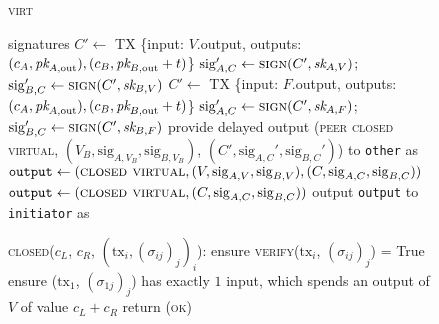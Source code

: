 \begin{figure}[H]
\begin{processbox}{\textsc{virt}}
\begin{algorithmic}[1]
{              signatures}
              \State $C' \gets$ TX \{input: $V$.output, outputs: $(c_A, \textit{pk}_{A,
              \mathrm{out}}), (c_B, \textit{pk}_{B, \mathrm{out}} + t)$\}
              \State $\mathrm{sig}_{A, C}' \gets \textsc{sign}(C', \textit{sk}_{A, V})$;
              $\mathrm{sig}_{B, C}' \gets \textsc{sign}(C', \textit{sk}_{B, V})$
            \Else \: 
              \State $C' \gets$ TX \{input: $F$.output, outputs: $(c_A, \textit{pk}_{A,
              \mathrm{out}}), (c_B, \textit{pk}_{B, \mathrm{out}} + t)$\}
              \State $\mathrm{sig}_{A, C}' \gets \textsc{sign}(C', \textit{sk}_{A, F})$;
              $\mathrm{sig}_{B, C}' \gets \textsc{sign}(C', \textit{sk}_{B, F})$
            \EndIf
            \State provide delayed output (\textsc{peer closed virtual}, $(V_B,
            \mathrm{sig}_{A, V_B}, \mathrm{sig}_{B, V_B})$, $(C',
            \mathrm{sig}_{A, C}', \mathrm{sig}_{B, C}')$) to \texttt{other} as
            \bob
          \EndIf
            \State $\mathtt{output} \gets (\textsc{closed virtual}, (V,
            \mathrm{sig}_{A, V}, \mathrm{sig}_{B, V}), (C, \mathrm{sig}_{A, C},
            \mathrm{sig}_{B, C}))$
          \Else
            \State $\mathtt{output} \gets (\textsc{closed virtual}, (C,
            \mathrm{sig}_{A, C}, \mathrm{sig}_{B, C}))$
          \EndIf
          \State output \texttt{output} to \texttt{initiator} as \alice
        \EndIf
        \Statex

        \State \textsc{closed}($c_L$, $c_R$, $(\mathrm{tx}_i,
        (\sigma_{ij})_j)_i$):
        \Indent
            \State ensure \textsc{verify}($\mathrm{tx}_i$, $(\sigma_{ij})_j$) =
            True
          \EndFor
          \State ensure ($\mathrm{tx}_1$, $(\sigma_{1j})_j$) has exactly $1$
          input, which spends an output of $V$ of value $c_L + c_R$
          \State return (\textsc{ok})
        \EndIndent
    \end{algorithmic}
  \end{processbox}
  \caption{}
  \label{code:virtual-layer}
\end{figure}
